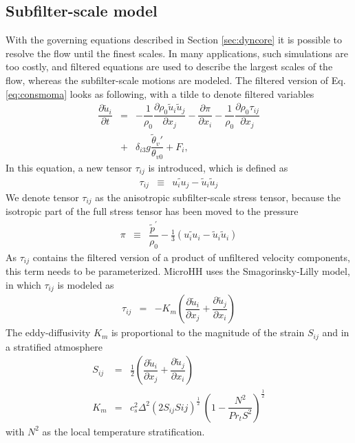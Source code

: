\documentclass[gmd]{copernicus}
\newcommand{\uf}{\ensuremath{\widetilde{u}}}
\newcommand{\thetaf}{\ensuremath{\widetilde{\theta}}}
\begin{document}
\subsection{Subfilter-scale model}
With the governing equations described in Section \ref{sec:dyncore} it is possible to resolve the flow until the finest scales. In many applications, such simulations are too costly, and filtered equations are used to describe the largest scales of the flow, whereas the subfilter-scale motions are modeled. The filtered version of Eq. \ref{eq:consmoma} looks as following, with a tilde to denote filtered variables
\begin{eqnarray}
\nonumber \dfrac{\partial \uf_i}{\partial t} & = & - \dfrac{1}{\rho_0} \dfrac{\partial \rho_0 \uf_i \uf_j}{\partial x_j} 
- \dfrac{\partial \pi}{\partial x_i} - \dfrac{1}{\rho_0} \dfrac{\partial \rho_0 \tau_{ij}}{\partial x_j}\\
& + & \delta_{i3} g \dfrac{\thetaf_v'}{\theta_{v0}} + F_i,\label{eq:consmoma_filter}
\end{eqnarray}
In this equation, a new tensor $\tau_{ij}$ is introduced, which is defined as
\begin{eqnarray}
\tau_{ij}  & \equiv & \widetilde{u_i u_j} - \uf_i \uf_j
\end{eqnarray}
We denote tensor $\tau_{ij}$ as the anisotropic subfilter-scale stress tensor, because the isotropic part of the full stress tensor has been moved to the pressure
\begin{eqnarray}
\pi        & \equiv & \dfrac{\widetilde{p}^\prime}{\rho_0} - \frac{1}{3} \left( \widetilde{u_i u_i} - \uf_i \uf_i \right)
\end{eqnarray}
As $\tau_{ij}$ contains the filtered version of a product of unfiltered velocity components, this term needs to be parameterized. MicroHH uses the Smagorinsky-Lilly \citep{Lilly1968} model, in which $\tau_{ij}$ is modeled as
\begin{eqnarray}
\tau_{ij} & = & -K_m \left( \dfrac{\partial \uf_i}{\partial x_j} + \dfrac{\partial \uf_j}{\partial x_i} \right)
\end{eqnarray}
The eddy-diffusivity $K_m$ is proportional to the magnitude of the strain $S_{ij}$ and in a stratified atmosphere
\begin{eqnarray}
S_{ij} & = & \frac{1}{2} \left( \dfrac{\partial \uf_i}{\partial x_j} + \dfrac{\partial \uf_j}{\partial x_i} \right)\\
K_m    & = & c_s^2 \Delta^2 \left( 2 S_{ij} S{ij} \right)^\frac{1}{2} \
                    \left(1 - \dfrac{N^2}{Pr_t S^2} \right)^\frac{1}{2}
\end{eqnarray}
with $N^2$ as the local temperature stratification.
\end{document}
